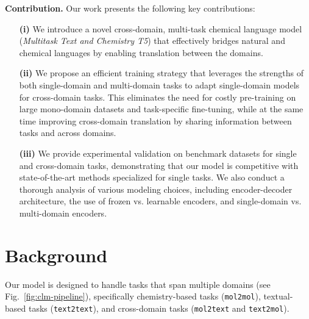 \documentclass[nohyperref]{article}
\theoremstyle{plain}
\theoremstyle{definition}
\theoremstyle{remark}
\begin{document}
\textbf{Contribution.}
Our work presents the following key contributions: 
\begin{itemize}
    \item[\textbf{(i)}] We introduce a novel cross-domain, multi-task chemical language model (\emph{Multitask Text and Chemistry T5}) that effectively bridges natural and chemical languages by enabling translation between the domains. 
\item[\textbf{(ii)}] We propose an efficient training strategy that leverages the strengths of both single-domain and multi-domain tasks to adapt single-domain models for cross-domain tasks. This eliminates the need for costly pre-training on large mono-domain datasets and task-specific fine-tuning, while at the same time improving cross-domain translation by sharing information between tasks and across domains. 
\item[\textbf{(iii)}] We provide experimental validation on benchmark datasets for single and cross-domain tasks, demonstrating that our model is competitive with state-of-the-art methods specialized for single tasks. We also conduct a thorough analysis of various modeling choices, including encoder-decoder architecture, the use of frozen vs. learnable encoders, and single-domain vs. multi-domain encoders. 
\end{itemize} \section{Background}
\label{section:background}
Our model is designed to handle tasks that span multiple domains (see Fig.~\ref{fig:clm-pipeline}), specifically chemistry-based tasks (\texttt{mol2mol}), textual-based tasks (\texttt{text2text}), and cross-domain tasks (\texttt{mol2text} and \texttt{text2mol}).
\end{document}

